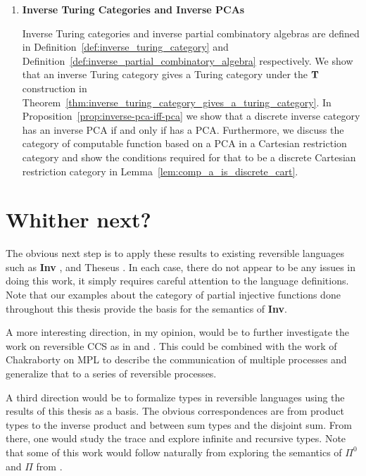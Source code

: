 \begin{enumerate}
\item \textbf{Inverse Turing Categories and Inverse PCAs}

Inverse Turing categories and inverse partial combinatory algebras are defined in
Definition~\ref{def:inverse_turing_category} and
Definition~\ref{def:inverse_partial_combinatory_algebra} respectively. We show that an inverse
Turing category gives a Turing category under the $\mathbf{T}$ construction in
Theorem~\ref{thm:inverse_turing_category_gives_a_turing_category}. In
Proposition~\ref{prop:inverse-pca-iff-pca} we show that a discrete inverse category \X has an inverse
PCA if and only if \Xt has a PCA. Furthermore, we discuss the category of computable function based
on a PCA in a Cartesian restriction category and show the conditions required for that to be a
discrete Cartesian restriction category in Lemma~\ref{lem:comp_a_is_discrete_cart}.
\end{enumerate}

\section{Whither next?}
\label{sec:whither-next}

The obvious next step is to apply these results to existing reversible languages such as
\textbf{Inv} \cite{muetal04:injreversible}, and Theseus
\cite{james2013isomorphic,james2012information}. In each case, there do not appear to be any issues
in doing this work, it simply requires careful attention to the language definitions. Note that our
examples about the category of partial injective functions done throughout this thesis provide the
basis for the semantics of \textbf{Inv}.

A more interesting direction, in my opinion, would be to further investigate the work on reversible
CCS as in \cite{danos2004reversible} and \cite{phillips2006operational}. This could be combined with
the work of Chakraborty on MPL \cite{chakraborty2014} to describe the communication of multiple
processes and generalize that to a series of reversible processes.

A third direction would be to formalize types in reversible languages using the results of this
thesis as a basis. The obvious correspondences are from product types to the inverse product and
between sum types and the disjoint sum. From there, one would study the trace and explore infinite
and recursive types. Note that some of this work would follow naturally from exploring the semantics
of $\Pi^0$ and $\Pi$ from \cite{james2013isomorphic,james2012information}.



